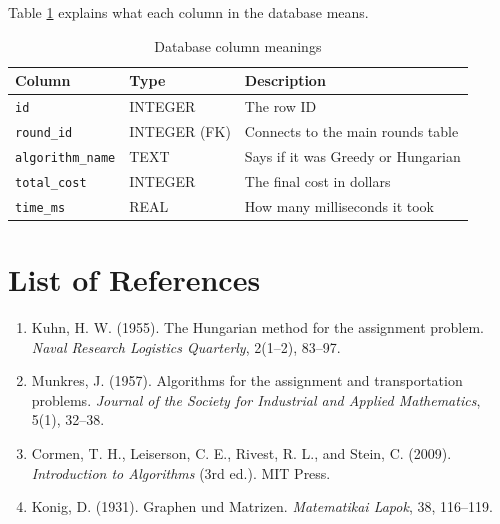 \documentclass[12pt,a4paper]{article}
\begin{document}
\noindent
Table \ref{tab:db-schema} explains what each column in the database means.

\begin{table}[H]
    \centering
    \caption{Database column meanings}
    \label{tab:db-schema}
    \begin{tabularx}{\linewidth}{llX}
        \toprule
        \textbf{Column}          & \textbf{Type}    & \textbf{Description}                             \\
        \midrule
        \texttt{id}              & INTEGER          & The row ID                                       \\
        \texttt{round\_id}       & INTEGER (FK)     & Connects to the main rounds table                \\
        \texttt{algorithm\_name} & TEXT             & Says if it was Greedy or Hungarian               \\
        \texttt{total\_cost}     & INTEGER          & The final cost in dollars                        \\
        \texttt{time\_ms}        & REAL             & How many milliseconds it took                    \\
        \bottomrule
    \end{tabularx}
\end{table}

\clearpage
{}
\section*{List of References}

\begin{enumerate}
    \item Kuhn, H. W. (1955). The Hungarian method for the assignment problem.
          \textit{Naval Research Logistics Quarterly}, 2(1--2), 83--97.
    \item Munkres, J. (1957). Algorithms for the assignment and transportation
          problems. \textit{Journal of the Society for Industrial and Applied
          Mathematics}, 5(1), 32--38.
    \item Cormen, T. H., Leiserson, C. E., Rivest, R. L., and Stein, C. (2009).
          \textit{Introduction to Algorithms} (3rd ed.). MIT Press.
    \item Konig, D. (1931). Graphen und Matrizen.
          \textit{Matematikai Lapok}, 38, 116--119.
\end{enumerate}
\end{document}
